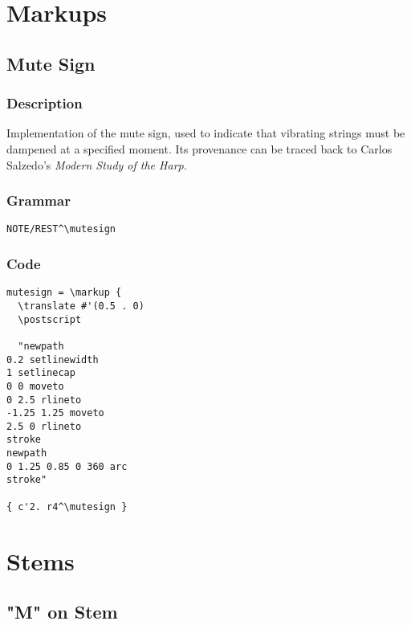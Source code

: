 \documentclass[11pt, oneside]{book}   	%
\begin{document}


\chapter {Markups}


\section {Mute Sign}
\hfill

\subsection{Description}
Implementation of the mute sign, used to indicate that vibrating strings must be dampened at a specified moment. Its provenance can be traced back to Carlos Salzedo's \textit{Modern Study of the Harp}.\autocite[19]{RN4} 

\subsection{Grammar}
\begin{verbatim}
NOTE/REST^\mutesign
\end{verbatim}
\subsection{Code}
\begin{verbatim}
mutesign = \markup {
  \translate #'(0.5 . 0)
  \postscript

  "newpath
0.2 setlinewidth
1 setlinecap
0 0 moveto
0 2.5 rlineto
-1.25 1.25 moveto
2.5 0 rlineto
stroke
newpath
0 1.25 0.85 0 360 arc
stroke"

{ c'2. r4^\mutesign }
\end{verbatim}
\vfill \break






\chapter {Stems}


\section {"M" on Stem}
\hfill
\end{document}
